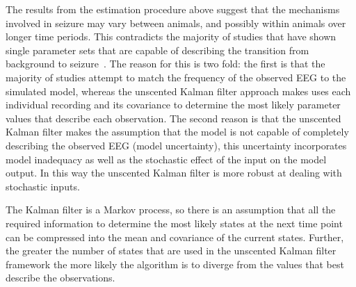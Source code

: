 The results from the estimation procedure above suggest that the mechanisms involved in seizure may vary between animals, and possibly within animals over longer time periods. This contradicts the majority of studies that have shown single parameter sets that are capable of describing the transition from background to seizure~\citep{wendling2005interictal}. The reason for this is two fold: the first is that the majority of studies attempt to match the frequency of the observed EEG to the simulated model, whereas the unscented Kalman filter approach makes uses each individual recording and its covariance to determine the most likely parameter values that describe each observation. The second reason is that the unscented Kalman filter makes the assumption that the model is not capable of completely describing the observed EEG (model uncertainty), this uncertainty incorporates model inadequacy as well as the stochastic effect of the input on the model output. In this way the unscented Kalman filter is more robust at dealing with stochastic inputs.

The Kalman filter is a Markov process, so there is an assumption that all the required information to determine the most likely states at the next time point can be compressed into the mean and covariance of the current states. Further, the greater the number of states that are used in the unscented Kalman filter framework the more likely the algorithm is to diverge from the values that best describe the observations. 


